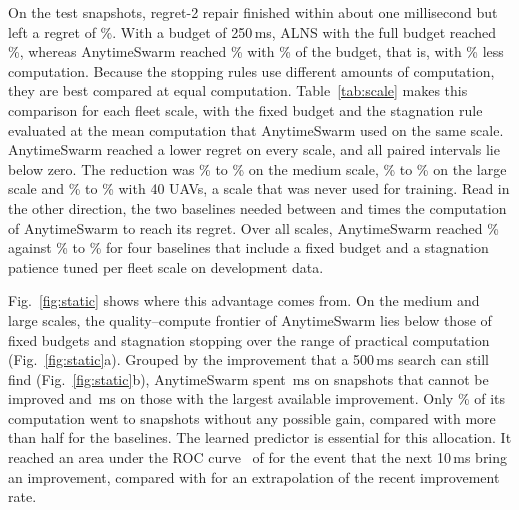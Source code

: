 \label{sec:static}
On the  test snapshots, regret-2 repair finished within about one millisecond but left a regret of
\%. With a budget of 250\,ms, ALNS with the full budget reached \%, whereas
AnytimeSwarm reached \% with \% of the budget, that is, with \% less computation.
Because the stopping rules use different amounts of computation, they are best compared at equal computation.
Table~\ref{tab:scale} makes this comparison for each fleet scale, with the fixed budget and the stagnation rule evaluated
at the mean computation that AnytimeSwarm used on the same scale. AnytimeSwarm reached a lower regret on every scale,
and all paired intervals lie below zero. The reduction was \% to \% on the
medium scale, \% to \% on the large scale and \% to
\% with 40 UAVs, a scale that was never used for training. Read in the other direction, the two
baselines needed between  and  times the computation of AnytimeSwarm to
reach its regret. Over all scales, AnytimeSwarm reached \% against \% to
\% for four baselines that include a fixed budget and a stagnation patience tuned per fleet scale
on development data.


Fig.~\ref{fig:static} shows where this advantage comes from. On the medium and large scales, the quality--compute
frontier of AnytimeSwarm lies below those of fixed budgets and stagnation stopping over the range of practical
computation (Fig.~\ref{fig:static}a). Grouped by the improvement that a 500\,ms search can still find
(Fig.~\ref{fig:static}b), AnytimeSwarm spent \,ms on snapshots that cannot be improved and
\,ms on those with the largest available improvement. Only \% of its computation went
to snapshots without any possible gain, compared with more than half for the baselines. The learned predictor is
essential for this allocation. It reached an area under the ROC curve~\cite{fawcett2006roc} of  for the
event that the next 10\,ms bring an improvement, compared with  for an extrapolation of the recent
improvement rate.

